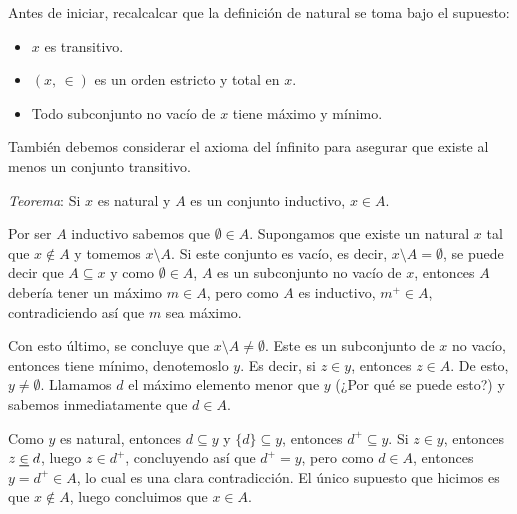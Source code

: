 \documentclass{article}
\newcommand{\pair}[2]{(#1, \, #2)}
\newcommand{\ineq}{%
  \mathrel{\ooalign{%
    $\in$\cr
    \hidewidth\raisebox{-0.6ex}{\rule{0.7em}{0.6pt}}\hidewidth\cr
  }}}
\begin{document}
  Antes de iniciar, recalcalcar que la definición de natural se toma bajo el supuesto:

  \begin{itemize}
    \item $x$ es transitivo.
    \item $\pair{x}{\in}$ es un orden estricto y total  en $x$.
    \item Todo subconjunto no vacío de $x$ tiene máximo y mínimo.
  \end{itemize}

  También debemos considerar el axioma del ínfinito para asegurar que existe al menos 
  un conjunto transitivo.
  \newline\newline


  \textit{Teorema}: Si $x$ es natural y $A$ es un conjunto inductivo, $x \in A$.
  \newline\newline

  Por ser $A$ inductivo sabemos que $\emptyset \in A$. Supongamos que existe 
  un natural $x$ tal que $x \not\in A$ y tomemos $x\setminus A$. Si este conjunto es 
  vacío, es decir, $x\setminus A = \emptyset$, se puede decir que $A \subseteq x$
  y como $\emptyset \in A$, $A$ es un subconjunto no vacío de $x$, entonces 
  $A$ debería tener un máximo $m \in A$, pero como $A$ es inductivo, $m^+ \in A$, 
  contradiciendo así que $m$ sea máximo.
  \newline\newline


  Con esto último, se concluye que $x \setminus A \neq \emptyset$. Este es un subconjunto de $x$ no vacío,
  entonces tiene mínimo, denotemoslo $y$. Es decir, si $z \in y$, entonces $z \in A$.
  De esto, $y \neq \emptyset$. Llamamos $d$ el máximo elemento menor que $y$ (¿Por qué se puede esto?)
  y sabemos inmediatamente que $d \in A$.
  \newline\newline


  Como $y$ es natural, entonces $d \subseteq y$ y $\{d\} \subseteq y$, entonces $d^+ \subseteq y$.
  Si $z \in y$, entonces $z \ineq d$, luego $z \in d^+$, concluyendo así que 
  $d^+ = y$, pero como $d \in A$, entonces $y = d^+ \in A$, lo cual es una clara 
  contradicción. El único supuesto que hicimos es que $x \not\in A$, luego concluimos
  que $x \in A$.
\end{document}
